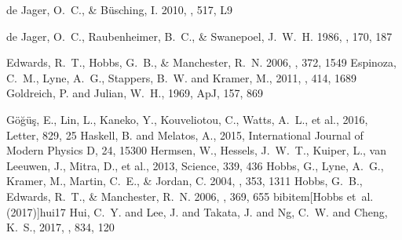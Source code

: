 \documentclass[12pt,preprint]{aastex}
\begin{document}
\begin{thebibliography}{}
  {de Jager}, O.~C., \& {B{\"u}sching}, I. 2010, \aap, 517, L9

  {de Jager}, O.~C., {Raubenheimer}, B.~C., \& {Swanepoel}, J.~W.~H. 1986, \aap,
  170, 187

  {Edwards}, R.~T., {Hobbs}, G.~B., \& {Manchester}, R.~N. 2006, \mnras, 372,
  1549
  {Espinoza}, C.~M., {Lyne}, A.~G., {Stappers}, B.~W. and
  {Kramer}, M., 2011, \mnras, 414, 1689
  {Goldreich}, P. and {Julian}, W.~H., 1969, ApJ, 157, 869

  G{\"o}{\u g}{\"u}{\c s}, E., {Lin}, L., {Kaneko}, Y.,
  {Kouveliotou}, C.,  {Watts}, A.~L., et al.,  2016, \apj Letter, 829, 25
  {Haskell}, B. and {Melatos}, A., 2015,  International Journal of Modern
  Physics D, 24, 15300
  {Hermsen}, W., {Hessels}, J.~W.~T., {Kuiper}, L., {van Leeuwen}, J.,
  {Mitra}, D., et al., 2013, Science, 339, 436
  {Hobbs}, G., {Lyne}, A.~G., {Kramer}, M., {Martin}, C.~E., \& {Jordan}, C.
  2004, \mnras, 353, 1311
  {Hobbs}, G.~B., {Edwards}, R.~T., \& {Manchester}, R.~N. 2006, \mnras, 369, 655
  bibitem[{Hobbs} {et~al.}(2017)]{hui17}
  {Hui}, C.~Y. and {Lee}, J. and {Takata}, J. and {Ng}, C.~W. and
  {Cheng}, K.~S., 2017, \apj, 834, 120
  

\end{thebibliography}
\end{document}
